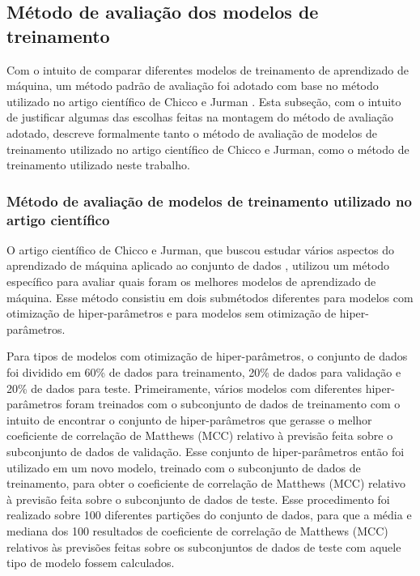 \subsection{Método de avaliação dos modelos de treinamento}

Com o intuito de comparar diferentes modelos de treinamento de aprendizado de máquina, um método padrão de avaliação foi adotado com base no método utilizado no artigo científico de Chicco e Jurman \cite{chicco2020}. Esta subseção, com o intuito de justificar algumas das escolhas feitas na montagem do método de avaliação adotado, descreve formalmente tanto o método de avaliação de modelos de treinamento utilizado no artigo científico de Chicco e Jurman, como o método de treinamento utilizado neste trabalho.

\subsubsection{Método de avaliação de modelos de treinamento utilizado no artigo científico}

O artigo científico de Chicco e Jurman, que buscou estudar vários aspectos do aprendizado de máquina aplicado ao conjunto de dados \cite{larxel_dataset}, utilizou um método específico para avaliar quais foram os melhores modelos de aprendizado de máquina. Esse método consistiu em dois submétodos diferentes para modelos com otimização de hiper-parâmetros e para modelos sem otimização de hiper-parâmetros.

Para tipos de modelos com otimização de hiper-parâmetros, o conjunto de dados foi dividido em 60\% de dados para treinamento, 20\% de dados para validação e 20\% de dados para teste. Primeiramente, vários modelos com diferentes hiper-parâmetros foram treinados com o subconjunto de dados de treinamento com o intuito de encontrar o conjunto de hiper-parâmetros que gerasse o melhor coeficiente de correlação de Matthews (MCC) relativo à previsão feita sobre o subconjunto de dados de validação. Esse conjunto de hiper-parâmetros então foi utilizado em um novo modelo, treinado com o subconjunto de dados de treinamento, para obter o coeficiente de correlação de Matthews (MCC) relativo à previsão feita sobre o subconjunto de dados de teste. Esse procedimento foi realizado sobre 100 diferentes partições do conjunto de dados, para que a média e mediana dos 100 resultados de coeficiente de correlação de Matthews (MCC) relativos às previsões feitas sobre os subconjuntos de dados de teste com aquele tipo de modelo fossem calculados.

